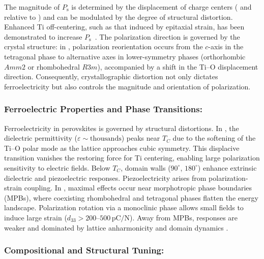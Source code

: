 \documentclass[a4paper,fleqn]{cas-sc}
\begin{document}
The magnitude of \( P_{\mathrm{s}} \) is determined by the displacement of charge centers ( and  relative to ) and can be modulated by the degree of structural distortion. Enhanced Ti off-centering, such as that induced by epitaxial strain, has been demonstrated to increase \( P_{\mathrm{s}} \)~\cite{zhang2023structural}. The polarization direction is governed by the crystal structure: in , polarization reorientation occurs from the \( c \)-axis in the tetragonal phase to alternative axes in lower-symmetry phases (orthorhombic \( Amm2 \) or rhombohedral \( R3m \)), accompanied by a shift in the Ti--O displacement direction. Consequently, crystallographic distortion not only dictates ferroelectricity but also controls the magnitude and orientation of polarization.

\subsubsection*{Ferroelectric Properties and Phase Transitions:}

\par Ferroelectricity in perovskites is governed by structural distortions. In , the dielectric permittivity ($\varepsilon \sim \text{thousands}$) peaks near $T_C$ due to the softening of the Ti--O polar mode as the lattice approaches cubic symmetry. This displacive transition vanishes the restoring force for Ti centering, enabling large polarization sensitivity to electric fields. Below $T_C$, domain walls ($90^\circ$, $180^\circ$) enhance extrinsic dielectric and piezoelectric responses. Piezoelectricity arises from polarization-strain coupling. In , maximal effects occur near morphotropic phase boundaries (MPBs), where coexisting rhombohedral and tetragonal phases flatten the energy landscape. Polarization rotation via a monoclinic phase allows small fields to induce large strain ($d_{33} > 200\text{--}500\,\text{pC/N}$). Away from MPBs, responses are weaker and dominated by lattice anharmonicity and domain dynamics \cite{damjanovic2010morphotropic}.
\subsubsection*{Compositional and Structural Tuning: }
\end{document}
